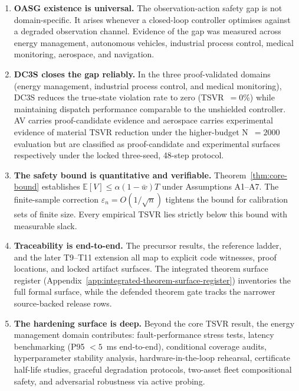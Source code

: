 \begin{enumerate}
  \item \textbf{OASG existence is universal.}  The observation-action safety
    gap is not domain-specific.  It arises whenever a closed-loop controller
    optimises against a degraded observation channel.  Evidence of the gap
    was measured across energy management, autonomous vehicles, industrial
    process control, medical monitoring, aerospace, and navigation.

  \item \textbf{DC3S closes the gap reliably.}  In the three
    proof-validated domains (energy management, industrial process control,
    and medical monitoring), DC3S reduces the true-state violation rate
    to zero (TSVR~$= 0$\%) while maintaining dispatch performance comparable
    to the unshielded controller.  AV carries proof-candidate evidence and
    aerospace carries experimental evidence of material TSVR reduction under
    the higher-budget N~$= 2000$ evaluation
    but are classified as proof-candidate and experimental surfaces respectively
    under the locked three-seed, 48-step protocol.

  \item \textbf{The safety bound is quantitative and verifiable.}
    Theorem~\ref{thm:core-bound} establishes
    $\mathbb{E}[V] \le \alpha(1-\bar{w})T$ under Assumptions A1--A7.  The
    finite-sample correction $\varepsilon_n = O(1/\sqrt{n})$ tightens the
    bound for calibration sets of finite size.  Every empirical TSVR lies
    strictly below this bound with measurable slack.

  \item \textbf{Traceability is end-to-end.}  The precursor results, the
    reference ladder, and the later T9--T11 extension all map to explicit
    code witnesses, proof locations, and locked artifact surfaces.  The
    integrated theorem surface register
    (Appendix~\ref{app:integrated-theorem-surface-register}) inventories the
    full formal surface, while the defended theorem gate tracks the narrower
    source-backed release rows.

  \item \textbf{The hardening surface is deep.}  Beyond the core TSVR
    result, the energy management domain contributes: fault-performance
    stress tests, latency benchmarking (P95 $< 5$~ms end-to-end),
    conditional coverage audits, hyperparameter stability analysis,
    hardware-in-the-loop rehearsal, certificate half-life studies, graceful
    degradation protocols, two-asset fleet compositional safety, and
    adversarial robustness via active probing.
\end{enumerate}


